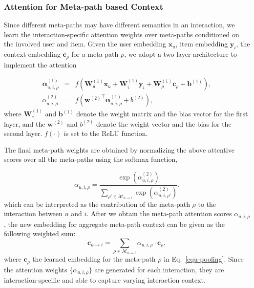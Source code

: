 

\subsubsection{Attention for Meta-path based Context}
Since different meta-paths may have different semantics in an interaction, we learn the interaction-specific attention weights over meta-paths conditioned on the involved user and item.  Given the user embedding $\mathbf{x}_u$, item embedding $\mathbf{y}_i$, the  context embedding $\mathbf{c}_\rho$ for  a meta-path $\rho$, we adopt a two-layer architecture to implement the attention

\begin{eqnarray}
\bm{\alpha}^{(1)}_{u, i, \rho} &=& f(\mathbf{W}^{(1)}_u\mathbf{x}_u + \mathbf{W}^{(1)}_i\mathbf{y}_i + \mathbf{W}^{(1)}_{\rho}\mathbf{c}_{\rho} + \mathbf{b}^{(1)}), \label{equ-attention1}\\
\alpha^{(2)}_{u, i, \rho} &=& f({\mathbf{w}^{(2)}}^{\top} \bm{\alpha}^{(1)}_{u, i, \rho} + b^{(2)}), \label{equ-attention2}
\end{eqnarray}
where $\mathbf{W}^{(1)}_*$ and $\mathbf{b}^{(1)}$ denote the weight matrix and the bias vector for the first layer, and the $\mathbf{w}^{(2)}$ and $b^{(2)}$ denote the weight vector and the bias for the second layer. $f(\cdot)$ is set to the ReLU function.

The final meta-path weights are obtained by normalizing the above attentive scores over all the meta-paths using the softmax function, 

\begin{equation} \label{equ-attentinscore}
\alpha_{u, i, \rho} = \frac{\exp(\alpha^{(2)}_{u, i, \rho})}{\sum_{\rho' \in \mathcal{M}_{u \rightarrow i}}\exp(\alpha^{(2)}_{u, i, \rho'})}.
\end{equation}
which can be interpreted as the contribution of the meta-path $\rho$ to the interaction between $u$ and $i$.
After we obtain the meta-path attention scores $\alpha_{u, i, \rho}$, the new embedding for aggregate meta-path context can be given  as the following weighted sum:
\begin{equation}\label{equ-path}
\mathbf{c}_{u \rightarrow i} = \sum_{\rho \in \mathcal{M}_{u \rightarrow i}}\alpha_{u, i, \rho} \cdot \mathbf{c}_{\rho},
\end{equation}
where $ \mathbf{c}_{\rho}$ the learned embedding for the meta-path $\rho$ in Eq.~\ref{equ-pooling}.
Since the attention weights $\{ \alpha_{u, i, \rho} \}$ are generated for each interaction, they are interaction-specific and able to capture varying interaction context.

